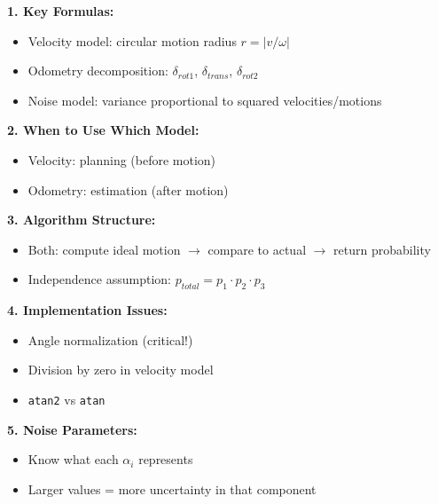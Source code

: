 \begin{tcolorbox}[colback=red!10!white,colframe=red!75!black,title=\textbf{What to Memorize for Exam}]

\textbf{1. Key Formulas:}
\begin{itemize}
    \item Velocity model: circular motion radius $r = |v/\omega|$
    \item Odometry decomposition: $\delta_{rot1}$, $\delta_{trans}$, $\delta_{rot2}$
    \item Noise model: variance proportional to squared velocities/motions
\end{itemize}

\textbf{2. When to Use Which Model:}
\begin{itemize}
    \item Velocity: planning (before motion)
    \item Odometry: estimation (after motion)
\end{itemize}

\textbf{3. Algorithm Structure:}
\begin{itemize}
    \item Both: compute ideal motion $\rightarrow$ compare to actual $\rightarrow$ return probability
    \item Independence assumption: $p_{total} = p_1 \cdot p_2 \cdot p_3$
\end{itemize}

\textbf{4. Implementation Issues:}
\begin{itemize}
    \item Angle normalization (critical!)
    \item Division by zero in velocity model
    \item \texttt{atan2} vs \texttt{atan}
\end{itemize}

\textbf{5. Noise Parameters:}
\begin{itemize}
    \item Know what each $\alpha_i$ represents
    \item Larger values = more uncertainty in that component
\end{itemize}

\end{tcolorbox}


